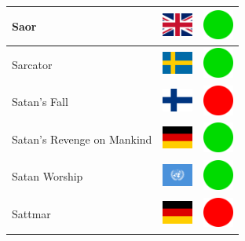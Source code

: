 \documentclass[12pt, a4paper, twoside]{report}
\begin{document}
\begin{center}
\begin{longtable}{|p{5cm}|p{2cm}|p{2cm}|}
 Saor                                                       & \includegraphics[width=1cm]{../img/flags/gb} &   \includegraphics[width=1cm]{../likes/y} \\ \hline
 Sarcator                                                   & \includegraphics[width=1cm]{../img/flags/se} &   \includegraphics[width=1cm]{../likes/y} \\ \hline
 Satan's Fall                                               & \includegraphics[width=1cm]{../img/flags/fi} &   \includegraphics[width=1cm]{../likes/n} \\ \hline
 Satan's Revenge on Mankind                                 & \includegraphics[width=1cm]{../img/flags/de} &   \includegraphics[width=1cm]{../likes/y} \\ \hline
 Satan Worship                                              & \includegraphics[width=1cm]{../img/flags/un} &   \includegraphics[width=1cm]{../likes/y} \\ \hline
 Sattmar                                                    & \includegraphics[width=1cm]{../img/flags/de} &   \includegraphics[width=1cm]{../likes/n} \\ \hline

\end{longtable}
\end{center}
\end{document}
